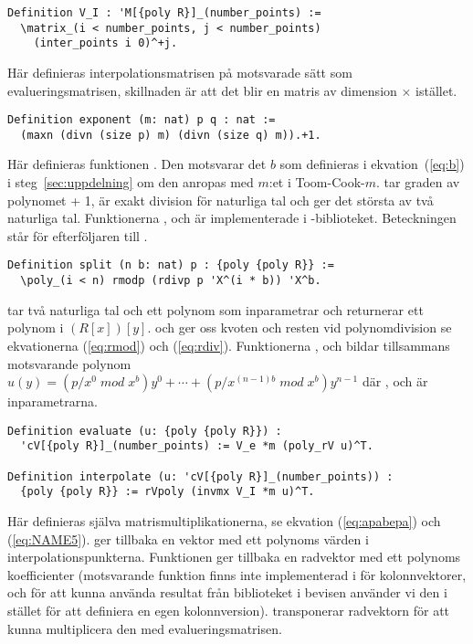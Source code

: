 \begin{lstlisting}
Definition V_I : 'M[{poly R}]_(number_points) :=
  \matrix_(i < number_points, j < number_points)
    (inter_points i 0)^+j.
\end{lstlisting}
Här definieras interpolationsmatrisen på motsvarade sätt som
evalueringsmatrisen, skillnaden är att det blir en matris av dimension
 $\times$  istället.

\begin{lstlisting}
Definition exponent (m: nat) p q : nat :=
  (maxn (divn (size p) m) (divn (size q) m)).+1.
\end{lstlisting}
Här definieras funktionen . Den motsvarar det $b$ som definieras i
ekvation~(\ref{eq:b}) i steg~\ref{sec:uppdelning} om den anropas med $m$:et i
Toom-Cook-$m$.  tar graden av polynomet  + 1,  är exakt
division för naturliga tal och  ger det största av två naturliga tal.
Funktionerna ,  och  är implementerade i
\ssr{}-biblioteket. Beteckningen  står för efterföljaren till .

\begin{lstlisting}
Definition split (n b: nat) p : {poly {poly R}} :=
  \poly_(i < n) rmodp (rdivp p 'X^(i * b)) 'X^b.
\end{lstlisting}
 tar två naturliga tal och ett polynom som inparametrar och returnerar
ett polynom i $(R[x])[y]$.  och  ger oss kvoten och resten
vid polynomdivision se ekvationerna (\ref{eq:rmod}) och (\ref{eq:rdiv}).
Funktionerna ,  och  bildar tillsammans
motsvarande polynom
$u(y)=(p/x^0\;mod\;x^b)y^0+\cdots+(p/x^{(n-1)b}\;mod\;x^b)y^{n-1}$ där ,
 och  är inparametrarna.

\begin{lstlisting}
Definition evaluate (u: {poly {poly R}}) :
  'cV[{poly R}]_(number_points) := V_e *m (poly_rV u)^T.

Definition interpolate (u: 'cV[{poly R}]_(number_points)) :
  {poly {poly R}} := rVpoly (invmx V_I *m u)^T.
\end{lstlisting}
Här definieras själva matrismultiplikationerna, se ekvation (\ref{eq:apabepa})
och (\ref{eq:NAME5}).  ger tillbaka en vektor med ett polynoms
värden i interpolationspunkterna. Funktionen  ger tillbaka en
radvektor med ett polynoms koefficienter (motsvarande funktion finns inte
implementerad i \ssr{} för kolonnvektorer, och för att kunna använda resultat
från biblioteket i bevisen använder vi den i stället för att definiera en egen
kolonnversion).  transponerar radvektorn för att kunna multiplicera den med
evalueringsmatrisen.


